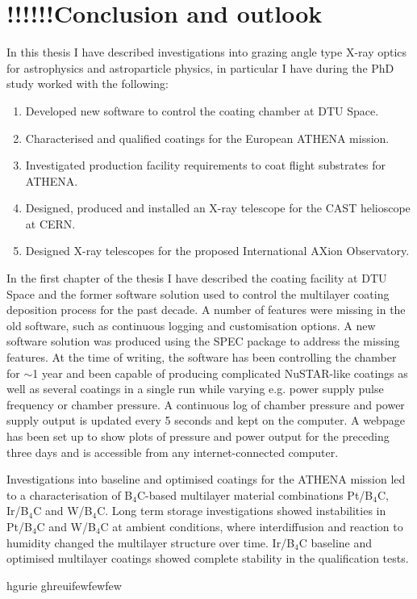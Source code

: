 \chapter{!!!!!!Conclusion and outlook}
In this thesis I have described investigations into grazing angle type X-ray optics for astrophysics and astroparticle physics, in particular I have during the PhD study worked with the following:

\begin{enumerate}
  \item Developed new software to control the coating chamber at DTU Space.
  \item Characterised and qualified coatings for the European ATHENA mission.
  \item Investigated production facility requirements to coat flight substrates for ATHENA.
  \item Designed, produced and installed an X-ray telescope for the CAST helioscope at CERN.
  \item Designed X-ray telescopes for the proposed International AXion Observatory.
\end{enumerate}

In the first chapter of the thesis I have described the coating facility at DTU Space and the former software solution used to control the multilayer coating deposition process for the past decade. A number of features were missing in the old software, such as continuous logging and customisation options. A new software solution was produced using the SPEC package to address the missing features. At the time of writing, the software has been controlling the chamber for $\sim$1 year and been capable of producing complicated NuSTAR-like coatings as well as several coatings in a single run while varying e.g. power supply pulse frequency or chamber pressure. A continuous log of chamber pressure and power supply output is updated every 5 seconds and kept on the computer. A webpage has been set up to show plots of pressure and power output for the preceding three days and is accessible from any internet-connected computer.

Investigations into baseline and optimised coatings for the ATHENA mission led to a characterisation of B$_4$C-based multilayer material combinations Pt/B$_4$C, Ir/B$_4$C and W/B$_4$C. Long term storage investigations showed instabilities in Pt/B$_4$C and W/B$_4$C at ambient conditions, where interdiffusion and reaction to humidity changed the multilayer structure over time. Ir/B$_4$C baseline and optimised multilayer coatings showed complete stability in the qualification tests.

hgurie ghreuifewfewfew
